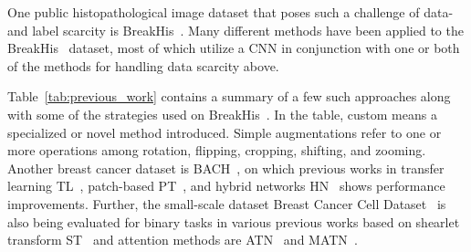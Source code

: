 \documentclass[conference]{IEEEtran}
\begin{document}
One public histopathological image dataset that poses such a challenge of data- and label scarcity is BreakHis~\cite{spanhol2016dataset}.
Many different methods have been applied to the BreakHis~\cite{spanhol2016dataset} dataset, most of which utilize a \ac{CNN} in conjunction with one or both of the methods for handling data scarcity above.



Table~\ref{tab:previous_work} contains a summary of a few such approaches along with some of the strategies used on BreakHis~\cite{spanhol2016dataset}.
In the table, custom means a specialized or novel method introduced. Simple augmentations refer to one or more operations among rotation, flipping, cropping, shifting, and zooming.
Another breast cancer dataset is BACH~\cite{aresta2019bach}, on which previous works in transfer learning TL~\cite{vesal2018classification}, patch-based PT~\cite{roy2019patch}, and hybrid networks HN~\cite{yan2020breast} shows performance improvements. Further, the small-scale dataset Breast Cancer Cell Dataset~\cite{gelasca2008evaluation} is also being evaluated for binary tasks in various previous works based on shearlet transform ST~\cite{rezaeilouyeh2016microscopic} and attention methods are ATN~\cite{ilse2018attention} and MATN~\cite{konstantinov2022multi}.
\end{document}
